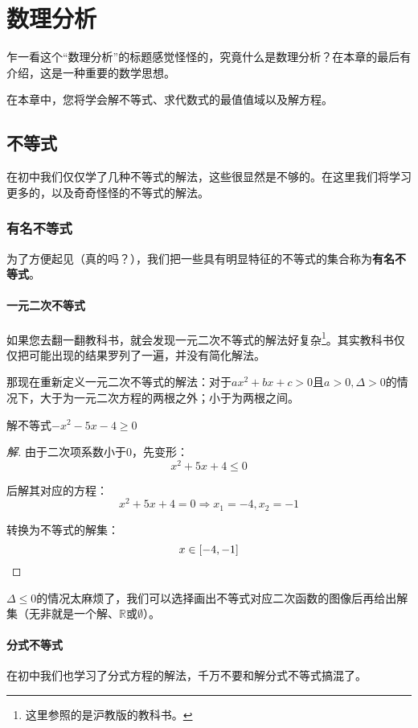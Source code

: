 \chapter{数理分析}
乍一看这个“数理分析”的标题感觉怪怪的，究竟什么是数理分析？在本章的最后有介绍，这是一种重要的数学思想。

在本章中，您将学会解不等式、求代数式的最值值域以及解方程。

\section{不等式}
在初中我们仅仅学了几种不等式的解法，这些很显然是不够的。在这里我们将学习更多的，以及奇奇怪怪的不等式的解法。

\subsection[有名]{有名不等式}
为了方便起见（真的吗？），我们把一些具有明显特征的不等式的集合称为\textbf{有名不等式}。

\subsubsection{一元二次不等式}
如果您去翻一翻教科书，就会发现一元二次不等式的解法好复杂\footnote{这里参照的是沪教版的教科书。}。其实教科书仅仅把可能出现的结果罗列了一遍，并没有简化解法。

那现在重新定义一元二次不等式的解法：对于$ax^2+bx+c>0$且$a>0,\Delta>0$的情况下，大于为一元二次方程的两根之外；小于为两根之间。

\begin{example}
	解不等式$-x^2-5x-4\geq0$
\end{example}
\begin{proof}[解]
	由于二次项系数小于$0$，先变形：\[x^2+5x+4\leq0\]

	后解其对应的方程：\[x^2+5x+4=0\Rightarrow x_1=-4,x_2=-1\]

	转换为不等式的解集：\[x\in[-4,-1]\qedhere\]
\end{proof}

$\Delta\leq0$的情况太麻烦了，我们可以选择画出不等式对应二次函数的图像后再给出解集（无非就是一个解、$\mathbb{R}$或$\emptyset$）。

\subsubsection{分式不等式}
在初中我们也学习了分式方程的解法，千万不要和解分式不等式搞混了。

